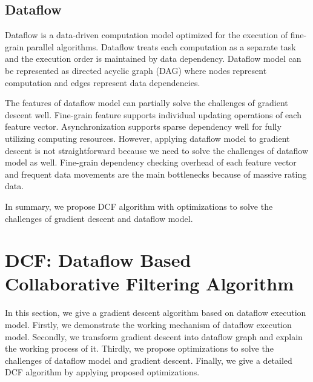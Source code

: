 \documentclass{llncs}
\begin{document}
\vspace{-10pt}
\subsection{Dataflow}
\vspace{-5pt}

Dataflow \cite{dataflow} is a data-driven computation model optimized for the execution of fine-grain parallel algorithms. Dataflow treats each computation as a separate task and the execution order is maintained by data dependency.
Dataflow model can be represented as directed acyclic graph (DAG) where nodes
represent computation and edges represent data dependencies.

The features of dataflow model can partially solve the challenges of gradient descent well. Fine-grain feature supports individual updating operations of each feature vector. Asynchronization supports sparse dependency well for fully utilizing computing resources. However, applying dataflow model to gradient descent is not straightforward because we need to solve the challenges of dataflow model as well. Fine-grain dependency checking overhead of each feature vector and frequent data movements are the main bottlenecks because of massive rating data.

In summary, we propose DCF algorithm with optimizations to solve the challenges of gradient descent and dataflow model.

\vspace{-10pt}
\section{DCF: Dataflow Based Collaborative Filtering Algorithm}
\vspace{-10pt}

In this section, we give a gradient descent algorithm based on dataflow execution model. Firstly, we demonstrate the working mechanism of dataflow execution model. Secondly, we transform gradient descent into dataflow graph and explain the working process of it. Thirdly, we propose optimizations to solve the challenges of dataflow model and gradient descent. Finally, we give a detailed DCF algorithm by applying proposed optimizations.
\vspace{-10pt}
\end{document}
